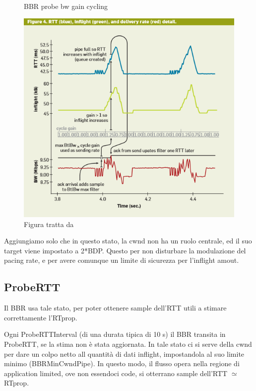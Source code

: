 \begin{figure}[H]

\center
\caption{BBR probe bw gain cycling}
\includegraphics[scale=1.2]{chapters/bbr/img/probe_bw_gain_cycling}
\caption*{Figura tratta da \cite[p.~62]{Cardwell:2017:BCC:3042068.3009824}}

\end{figure}   
   
Aggiungiamo solo che in questo stato, la cwnd non ha un ruolo centrale, ed il suo target viene impostato a 2*BDP. Questo per non disturbare la modulazione del pacing rate, e per avere comunque un limite di sicurezza per l'inflight amout.

\subsection{ProbeRTT} \label{ProbeRTT}

Il BBR usa tale stato, per poter ottenere sample dell'RTT utili a stimare correttamente l'RTprop. \bigskip

Ogni ProbeRTTInterval (di una durata tipica di 10 s) il BBR transita in ProbeRTT, se la stima non è stata aggiornata. In tale stato ci si serve della cwnd per dare un colpo netto all quantità di dati inflight, impostandola al suo limite minimo (BBRMinCwndPipe). In questo modo, il flusso opera nella regione di application limited, ove non essendoci code, si otterrano sample dell'RTT $ \simeq $ RTprop. \bigskip

